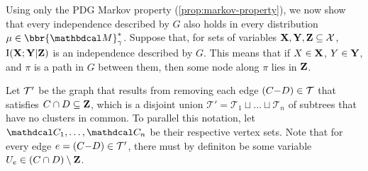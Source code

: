 \begin{lproof}
    
    Using only the PDG Markov property (\cref{prop:markov-property}), we now show that every independence described by $G$ also holds in every distribution $\mu \in \bbr{\dg M}^*_\gamma$.
    Suppose that, 
    for sets of variables $\mathbf{X}, \mathbf{Y}, \mathbf{Z} \subseteq \mathcal X$,
    $\operatorname{\mathrm{I}}(\mathbf{X}; \mathbf{Y}|\mathbf{Z})$ is an independence
    described by $G$.
    This means \parencite[Defn 4.8]{koller2009probabilistic} that
    if $X \in \mathbf{X}$, $Y \in \mathbf{Y}$, and $\pi$ is a path in $G$ between them, then
    some node along $\pi$ lies in $\mathbf{Z}$.
    
    
    Let $\cal T'$ be the graph that results from removing each edge $(C{-}D) \in \cal T$ that satisfies $C \cap D \subseteq \mathbf{Z}$, which is a disjoint union  $\mathcal T' = \mathcal T_1 \sqcup \ldots \sqcup \mathcal T_n$ of subtrees that have no clusters in common. 
    To parallel this notation, let $\C_1, \ldots, \C_n$ be their respective vertex sets.
    Note that for every edge $e=(C{-}D)\in \cal T'$, there must by definiton be some variable $U_e \in (C \cap D) \setminus \mathbf{Z}$. 
    

\end{lproof}
